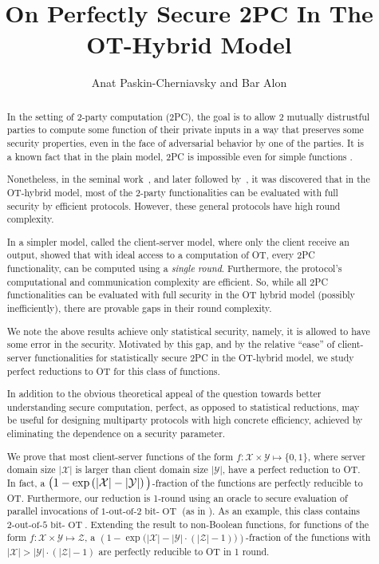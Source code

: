 \documentclass{llncs}
\title{On Perfectly Secure 2PC In The OT-Hybrid Model}
\author{Anat Paskin-Cherniavsky and Bar Alon}
\newcommand{\OT}{\operatorname{OT}}
\newcommand{\bOT}[2]{#1\text{-out-of-}#2\text{ bit-}\OT}
\newcommand{\X}{\mathcal{X}}
\newcommand{\Y}{\mathcal{Y}}
\renewcommand{\Z}{\mathcal{Z}}
\begin{document}
\maketitle

\begin{abstract}
In the setting of 2-party computation (2PC), the goal is to allow 2 mutually distrustful parties to compute some function of their private inputs in a way that preserves some security properties, even in the face of adversarial behavior by one of the parties. It is a known fact that in the plain model, 2PC is impossible even for simple functions \cite{CK89,Cleve86}.

Nonetheless, in the seminal work~\cite{GHKL08}, and later followed by~\cite{Ash14,makriyannis2014classification,asharov2015complete}, it was discovered that in the OT-hybrid model, most of the 2-party functionalities can be evaluated with full security by efficient protocols. However, these general protocols have high round complexity.
 
In a simpler model, called the client-server model, where only the client receive an output, \citet{IKOPS11} showed that with ideal access to a computation of OT, every 2PC functionality, can be computed using a \emph{single round}. Furthermore, the protocol's computational and communication complexity are efficient. So, while all 2PC functionalities can be evaluated with full security in the OT hybrid model (possibly inefficiently), there are provable gaps in their round complexity. 

We note the above results achieve only statistical security, namely, it is allowed to have some error in the security. Motivated by this gap, and by the relative ``ease'' of client-server functionalities for statistically secure 2PC in the OT-hybrid model, we study perfect reductions to OT for this class of functions.

In addition to the obvious theoretical appeal of the question towards better understanding secure computation, perfect, as opposed to statistical reductions, may be useful for designing multiparty protocols with high concrete efficiency, achieved by eliminating the dependence on a security parameter.

We prove that most client-server functions of the form $f:\X\times \Y\mapsto \{0,1\}$, where server domain size $|\X|$ is larger than client domain size $|\Y|$, have a perfect reduction to OT. In fact, a $\big(1-\operatorname{exp}\of{|\X|-|\Y|}\big)$-fraction of the functions are perfectly reducible to OT. 
Furthermore, our reduction is 1-round using an oracle to secure evaluation of parallel invocations of $\bOT12$ (as in \cite{IKOPS11}). As an example, this class contains $\bOT25$. Extending the result to non-Boolean functions, for functions of the form $f: \X\times\Y\mapsto\Z$, a $\left(1-\operatorname{exp}\Big(|\X|-|\Y|\cdot(|\Z|-1)\Big)\right)$-fraction of the functions with $|\X|>|\Y|\cdot(|\Z|-1)$ are perfectly reducible to OT in 1 round. 


\end{abstract}
\end{document}
